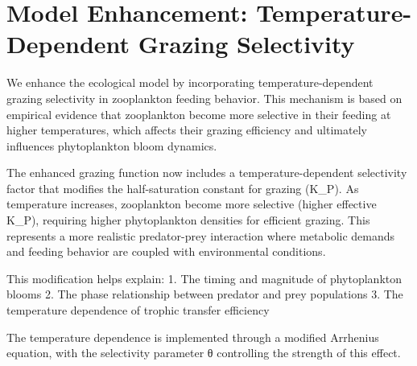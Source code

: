 \section{Model Enhancement: Temperature-Dependent Grazing Selectivity}

We enhance the ecological model by incorporating temperature-dependent grazing selectivity in zooplankton feeding behavior. This mechanism is based on empirical evidence that zooplankton become more selective in their feeding at higher temperatures, which affects their grazing efficiency and ultimately influences phytoplankton bloom dynamics.

The enhanced grazing function now includes a temperature-dependent selectivity factor that modifies the half-saturation constant for grazing (K_P). As temperature increases, zooplankton become more selective (higher effective K_P), requiring higher phytoplankton densities for efficient grazing. This represents a more realistic predator-prey interaction where metabolic demands and feeding behavior are coupled with environmental conditions.

This modification helps explain:
1. The timing and magnitude of phytoplankton blooms
2. The phase relationship between predator and prey populations
3. The temperature dependence of trophic transfer efficiency

The temperature dependence is implemented through a modified Arrhenius equation, with the selectivity parameter θ controlling the strength of this effect.
